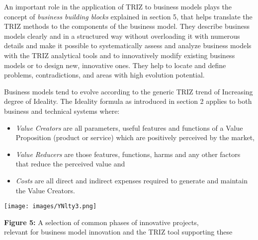 \documentclass[11pt,a4paper]{article}
\begin{document}
An important role in the application of TRIZ to business models plays the
concept of \emph{business building blocks} explained in section 5, that helps
translate the TRIZ methods to the components of the business model. They
describe business models clearly and in a structured way without overloading
it with numerous details and make it possible to systematically assess and
analyze business models with the TRIZ analytical tools and to innovatively
modify existing business models or to design new, innovative ones. They help
to locate and define problems, contradictions, and areas with high evolution
potential. \cite{6}

Business models tend to evolve according to the generic TRIZ trend of
Increasing degree of Ideality. The Ideality formula as introduced in
section 2 applies to both business and technical systems where:
\begin{itemize}
\item \emph{Value Creators} are all parameters, useful features and functions
  of a Value Proposition (product or service) which are positively perceived
  by the market,
\item \emph{Value Reducers} are those features, functions, harms and any other
  factors that reduce the perceived value and
\item \emph{Costs} are all direct and indirect expenses required to generate
  and maintain the Value Creators.
\end{itemize}

\begin{center}
  \texttt{[image: images/YNlty3.png]}
    
  \textbf{Figure 5:} A selection of common phases of innovative projects,\\
  relevant for business model innovation and the TRIZ tool supporting these
  \cite{5}
\end{center}
\end{document}
